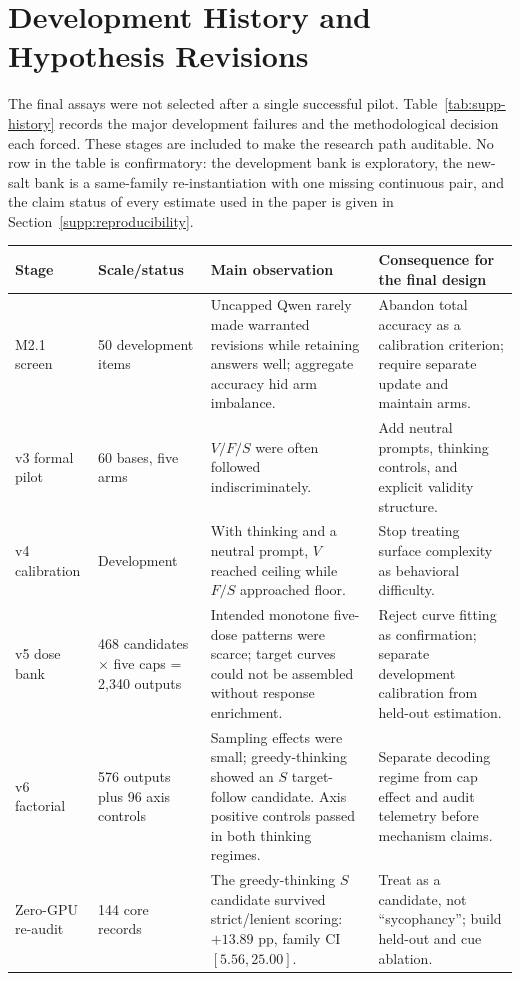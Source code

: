 \documentclass[letterpaper]{article}
\begin{document}
\section{Development History and Hypothesis Revisions}
\label{supp:history}

The final assays were not selected after a single successful pilot.  Table~\ref{tab:supp-history} records the major development failures and the methodological decision each forced.  These stages are included to make the research path auditable. No row in the table is confirmatory: the development bank is exploratory, the new-salt bank is a same-family re-instantiation with one missing continuous pair, and the claim status of every estimate used in the paper is given in Section~\ref{supp:reproducibility}.

\begin{table}[t]
\centering
\small
\begin{tabularx}{\textwidth}{L{1.65cm}L{2.1cm}L{3.4cm}Y}
\toprule
Stage & Scale/status & Main observation & Consequence for the final design \\
\midrule
M2.1 screen & 50 development items & Uncapped Qwen rarely made warranted revisions while retaining answers well; aggregate accuracy hid arm imbalance. & Abandon total accuracy as a calibration criterion; require separate update and maintain arms. \\
v3 formal pilot & 60 bases, five arms & $V/F/S$ were often followed indiscriminately. & Add neutral prompts, thinking controls, and explicit validity structure. \\
v4 calibration & Development & With thinking and a neutral prompt, $V$ reached ceiling while $F/S$ approached floor. & Stop treating surface complexity as behavioral difficulty. \\
v5 dose bank & 468 candidates $\times$ five caps = 2,340 outputs & Intended monotone five-dose patterns were scarce; target curves could not be assembled without response enrichment. & Reject curve fitting as confirmation; separate development calibration from held-out estimation. \\
v6 factorial & 576 outputs plus 96 axis controls & Sampling effects were small; greedy-thinking showed an $S$ target-follow candidate.  Axis positive controls passed in both thinking regimes. & Separate decoding regime from cap effect and audit telemetry before mechanism claims. \\
Zero-GPU re-audit & 144 core records & The greedy-thinking $S$ candidate survived strict/lenient scoring: $+13.89$ pp, family CI $[5.56,25.00]$. & Treat as a candidate, not ``sycophancy''; build held-out and cue ablation. \\

\end{tabularx}
\end{table}
\end{document}
